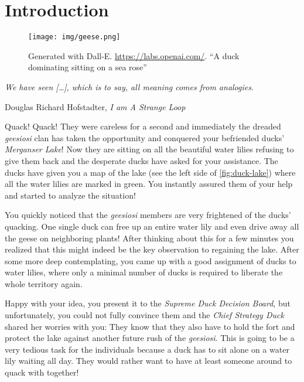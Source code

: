 \chapter{Introduction}\label{ch:introduction}

\vspace*{-50pt}

\begin{figure}[ht]
        \texttt{[image: img/geese.png]}
        \captionsetup{textformat=empty,labelformat=blank}
        \caption{Generated with Dall-E. \url{https://labs.openai.com/}. ``A duck dominating sitting on a sea rose''}
\end{figure}

\epigraph{\itshape We have seen [\ldots], which is to say, all meaning comes from analogies.}{Douglas Richard Hofstadter, \textit{I am A Strange Loop}}

Quack! Quack! They were careless for a second and immediately the dreaded \textit{geesiosi} clan has taken the opportunity and conquered your befriended ducks' \textit{Merganser Lake}!
Now they are sitting on all the beautiful water lilies refusing to give them back and the desperate ducks have asked for your assistance.
The ducks have given you a map of the lake (see the left side of \cref{fig:duck-lake}) where all the water lilies are marked in green.
You instantly assured them of your help and started to analyze the situation!

You quickly noticed that the \textit{geesiosi} members are very frightened of the ducks' quacking. 
One single duck can free up an entire water lily and even drive away all the geese on neighboring plants! After thinking about this for a few minutes you realized that this might indeed be the key observation to regaining the lake. 
After some more deep contemplating, you came up with a good assignment of ducks to water lilies, where only a minimal number of ducks is required to liberate the whole territory again.

Happy with your idea, you present it to the \textit{Supreme Duck Decision Board}, but unfortunately, you could not fully convince them and the \textit{Chief Strategy Duck} shared her worries with you: 
They know that they also have to hold the fort and protect the lake against another future rush of the \textit{geesiosi}.
This is going to be a very tedious task for the individuals because a duck has to sit alone on a water lily waiting all day. They would rather want to have at least someone around to quack with together!

